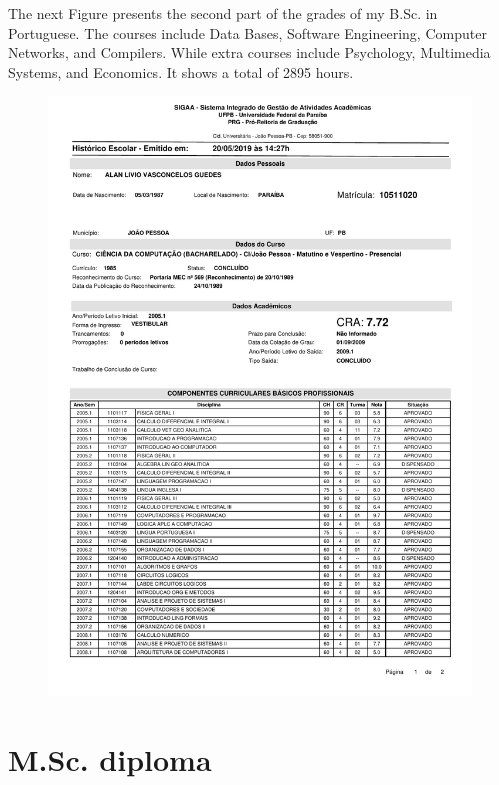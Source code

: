 \documentclass[10pt,a4paper,sans,colorlinks]{moderncv}
\begin{document}
The next Figure presents the second part of the grades of my B.Sc. in Portuguese.
The courses include Data Bases, Software Engineering, Computer Networks, and Compilers.
While extra courses include Psychology, Multimedia Systems, and Economics.
It shows a total of 2895 hours.
\vspace{2em}
\begin{figure}
    \centering
    \includegraphics[align=t,width=\textwidth,height=0.75\textheight, keepaspectratio=true,page=2, trim=0cm 0cm 0cm 2cm]{certificates/bsc-grades.pdf}
\end{figure}

\newpage

\section{M.Sc. diploma}
\end{document}
